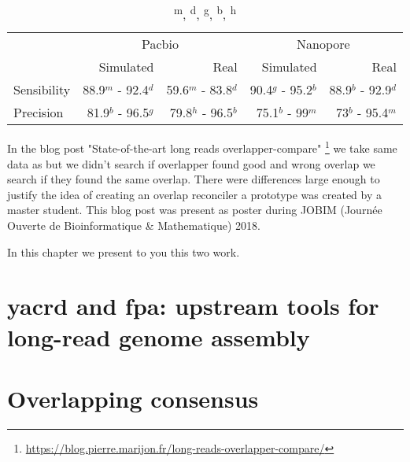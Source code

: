 \documentclass[main.tex]{subfiles}
\begin{document}
\begin{table}[ht]
    \centering
    \begin{tabular}{l|rr|rr}
                & \multicolumn{2}{c}{Pacbio}                & \multicolumn{2}{c}{Nanopore}              \\ 
                & Simulated           & Real                & Simulated         & Real                  \\ \hline
    Sensibility & 88.9$^m$ - 92.4$^d$ & 59.6$^m$ - 83.8$^d$ & 90.4$^g$ - 95.2$^b$ & 88.9$^b$ - 92.9$^d$ \\
    Precision   & 81.9$^b$ - 96.5$^g$ & 79.8$^h$ - 96.5$^b$ & 75.1$^b$ - 99$^m$   & 73$^b$ - 95.4$^m$   \\
    \end{tabular}
    \caption{\textsuperscript{m}, \textsuperscript{d}, \textsuperscript{g}, \textsuperscript{b}, \textsuperscript{h}\mhap}
    \label{preassembly:tab:ovl_result}
\end{table}

In the blog post "State-of-the-art long reads overlapper-compare" \footnote{\url{https://blog.pierre.marijon.fr/long-reads-overlapper-compare/}} we take same data as \cite{ovl_bench} but we didn't search if overlapper found good and wrong overlap we search if they found the same overlap. There were differences large enough to justify the idea of creating an overlap reconciler a prototype was created by a master student. 
This blog post was present as poster during JOBIM (Journée Ouverte de Bioinformatique \& Mathematique) 2018.


In this chapter we present to you this two work.

\section{yacrd and fpa: upstream tools for long-read genome assembly} \label{section:preassembly:yacrd_fpa}




\section{Overlapping consensus}\label{section:preassembly:ovl_consensus}

\end{document}
